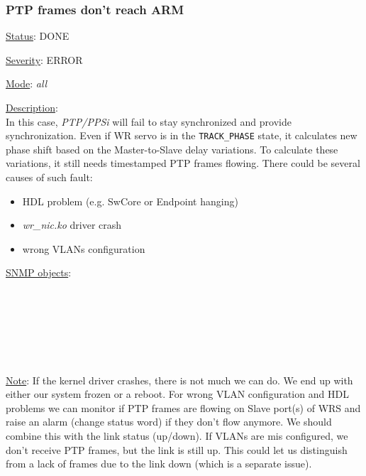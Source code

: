 \subsubsection{\bf PTP frames don't reach ARM}
		\label{fail:timing:no_frames}
		\begin{pck_descr}
			\item [] \underline{Status}: DONE
			\item [] \underline{Severity}: ERROR
			\item [] \underline{Mode}: \emph{all}
			\item [] \underline{Description}:\\
				In this case, \emph{PTP/PPSi} will fail to stay synchronized and provide
				synchronization. Even if WR servo is in the \texttt{TRACK\_PHASE} state,
				it calculates new phase shift based on the Master-to-Slave delay
				variations. To calculate these variations, it still needs timestamped
				PTP frames flowing. There could be several causes of such fault:
				\begin{itemize}
					\item HDL problem (e.g. SwCore or Endpoint hanging)
					\item \emph{wr\_nic.ko} driver crash
					\item wrong VLANs configuration
				\end{itemize}
			\item [] \underline{SNMP objects}:\\
				\\
				\\
				\\
				\\
				\\
				\\
			\item [] \underline{Note}: If the kernel driver crashes, there is not much
				we can do. We end up with either our system frozen or a reboot. For
				wrong VLAN configuration and HDL problems we can monitor if PTP frames
				are flowing on Slave port(s) of WRS and raise an alarm (change status
				word) if they don't flow anymore. We should combine this with the link
				status (up/down). If VLANs are mis configured, we don't receive PTP
				frames, but the link is still up. This could let us distinguish from a
				lack of frames due to the link down (which is a separate issue).
		\end{pck_descr}

